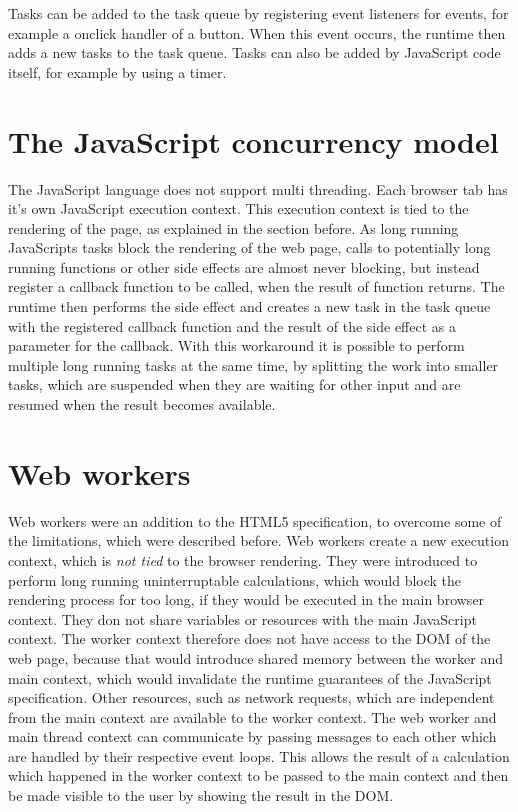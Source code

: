\documentclass[
	ruledheaders=section,%
	class=report,%
	thesis={type=bachelor},%
	accentcolor=9c,%
	custommargins=true,%
	marginpar=false,%
	parskip=half-,%
	fontsize=11pt,%
]{tudapub}
\begin{document}
  Tasks can be added to the task queue by registering event listeners for events, for example a onclick handler of a button. When this event occurs, the runtime then adds a new tasks to the task queue. Tasks can also be added by JavaScript code itself, for example by using a timer.

  
  \section{The JavaScript concurrency model}
  
  The JavaScript language does not support multi threading. Each browser tab has it's own JavaScript execution context. This execution context is tied to the rendering of the page, as explained in the section before. As long running JavaScripts tasks block the rendering of the web page, calls to potentially long running functions or other side effects are almost never blocking, but instead register a callback function to be called, when the result of function returns. The runtime then performs the side effect and creates a new task in the task queue with the registered callback function and the result of the side effect as a parameter for the callback. With this workaround it is possible to perform multiple long running tasks at the same time, by splitting the work into smaller tasks, which are suspended when they are waiting for other input and are resumed when the result becomes available.
  
  
  \section{Web workers}

  Web workers were an addition to the HTML5 specification, to overcome some of the limitations, which were described before. Web workers create a new execution context, which is \textit{not tied} to the browser rendering. They were introduced to perform long running uninterruptable calculations, which would block the rendering process for too long, if they would be executed in the main browser context. They don not share variables or resources with the main JavaScript context. The worker context therefore does not have access to the DOM of the web page, because that would introduce shared memory between the worker and main context, which would invalidate the runtime guarantees of the JavaScript specification. Other resources, such as network requests, which are independent from the main context are available to the worker context. The web worker and main thread context can communicate by passing messages to each other which are handled by their respective event loops. This allows the result of a calculation which happened in the worker context to be passed to the main context and then be made visible to the user by showing the result in the DOM.
\end{document}
